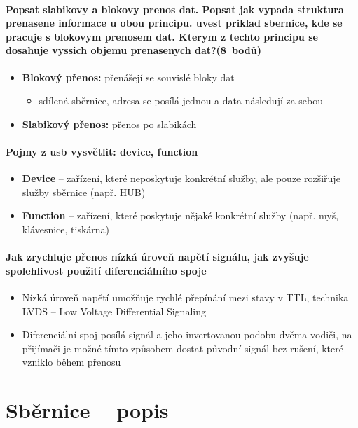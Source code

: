\documentclass[a5paper,10pt]{article}
\begin{document}
\paragraph{Popsat slabikovy a blokovy prenos dat. Popsat jak vypada struktura prenasene informace u obou principu. uvest priklad sbernice, kde se pracuje s blokovym prenosem dat. Kterym z techto principu se dosahuje vyssich objemu prenasenych dat?\hfill(8~bodů)}
\begin{itemize}
	\item \textbf{Blokový přenos:} přenášejí se souvislé bloky dat
	\begin{itemize}
		\item sdílená sběrnice, adresa se posílá jednou a data následují za sebou
	\end{itemize}
	\item \textbf{Slabikový přenos:} přenos po slabikách	
\end{itemize}

\paragraph{Pojmy z usb vysvětlit: device, function}
\begin{itemize}
	\item \textbf{Device} -- zařízení, které neposkytuje konkrétní služby, ale pouze rozšiřuje služby sběrnice (např. HUB)
	\item \textbf{Function} -- zařízení, které poskytuje nějaké konkrétní služby (např. myš, klávesnice, tiskárna)	
\end{itemize}

\paragraph{Jak zrychluje přenos nízká úroveň napětí signálu, jak zvyšuje spolehlivost použití diferenciálního spoje}
\begin{itemize}
	\item Nízká úroveň napětí umožňuje rychlé přepínání mezi stavy v TTL, technika LVDS -- Low Voltage Differential Signaling
	\item Diferenciální spoj posílá signál a jeho invertovanou podobu dvěma vodiči, na přijímači je možné tímto způsobem dostat původní signál bez rušení, které vzniklo během přenosu 
\end{itemize}



\newpage
\section{Sběrnice -- popis}
\end{document}
